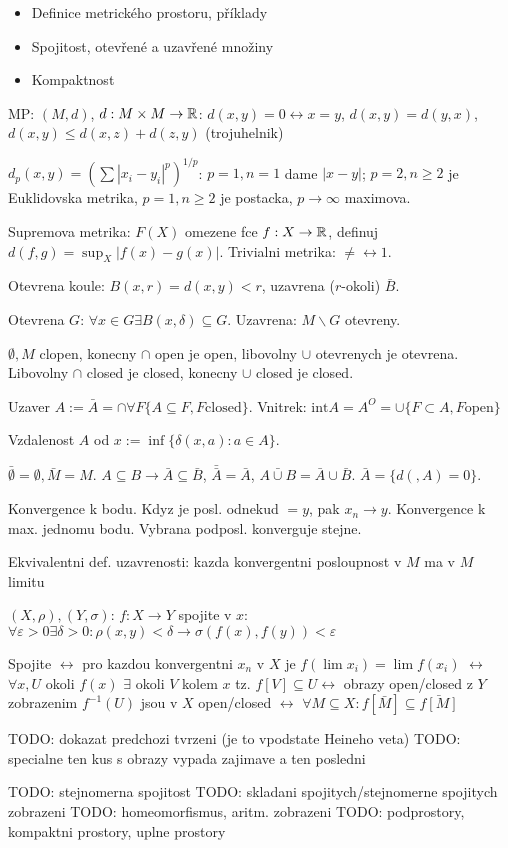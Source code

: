 \begin{itemize}
\item Definice metrického prostoru, příklady
\item Spojitost, otevřené a uzavřené množiny
\item Kompaktnost
\end{itemize}

MP: $(M,d)$, $d:M\times M\rightarrow\mathbb{R}$: $d(x,y)=0\leftrightarrow x=y$,
$d(x,y)=d(y,x)$, $d(x,y)\leq d(x,z)+d(z,y)$ (trojuhelnik)

$d_p(x,y)=(\sum|x_i-y_i|^p)^{1/p}$: $p=1,n=1$ dame $|x-y|$; $p=2,n\geq 2$
je Euklidovska metrika, $p=1,n\geq 2$ je postacka, $p\rightarrow\infty$
maximova.

Supremova metrika: $F(X)$ omezene fce $f:X\rightarrow\mathbb{R}$, definuj
$d(f,g)=\sup_{X}|f(x)-g(x)|$. Trivialni metrika: $\neq\leftrightarrow 1$.

Otevrena koule: $B(x,r)={d(x,y)<r}$, uzavrena ($r$-okoli) $\bar{B}$.

Otevrena $G$: $\forall x\in G\exists B(x,\delta)\subseteq G$.
Uzavrena: $M\smallsetminus G$ otevreny.

$\emptyset,M$ clopen, konecny $\cap$ open je open, libovolny $\cup$ otevrenych
je otevrena.
Libovolny $\cap$ closed je closed, konecny $\cup$ closed je closed.

Uzaver $A := \bar{A}=\cap{\forall F}\{A\subseteq F, F\mathrm{ closed}\}$.
Vnitrek: $\mathrm{int} A=A^O=\cup\{F\subset A, F\mathrm{ open}\}$

Vzdalenost $A$ od $x :=\inf\{\delta(x,a):a\in A\}$.

$\bar{\emptyset}=\emptyset,\bar{M}=M$.
$A\subseteq B\rightarrow\bar{A}\subseteq\bar{B}$, $\bar{\bar{A}}=\bar{A}$,
$\bar{A\cup B}=\bar{A}\cup\bar{B}$.
$\bar{A}=\{d(,A)=0\}$.

Konvergence k bodu. Kdyz je posl. odnekud $=y$, pak $x_n\rightarrow y$.
Konvergence k max. jednomu bodu. Vybrana podposl. konverguje stejne.

Ekvivalentni def. uzavrenosti: kazda konvergentni posloupnost v $M$ ma v $M$
limitu

$(X,\rho),(Y,\sigma)$: $f:X\rightarrow Y$ spojite v $x$:
$\forall\varepsilon>0 \exists\delta>0:
\rho(x,y)<\delta\rightarrow\sigma(f(x),f(y))<\varepsilon$

Spojite $\leftrightarrow$ pro kazdou konvergentni $x_n$ v $X$ je $f(\lim
x_i)=\lim f(x_i)$ $\leftrightarrow$ $\forall x,U$ okoli $f(x)$ $\exists$ okoli
$V$ kolem $x$ tz. $f[V]\subseteq U \leftrightarrow$ obrazy open/closed
z $Y$ zobrazenim $f^{-1}(U)$ jsou v $X$ open/closed $\leftrightarrow$
$\forall M\subseteq X: f[\bar{M}]\subseteq\bar{f[M]}$

TODO: dokazat predchozi tvrzeni (je to vpodstate Heineho veta)
TODO: specialne ten kus s obrazy vypada zajimave a ten posledni

TODO: stejnomerna spojitost
TODO: skladani spojitych/stejnomerne spojitych zobrazeni
TODO: homeomorfismus, aritm. zobrazeni
TODO: podprostory, kompaktni prostory, uplne prostory
